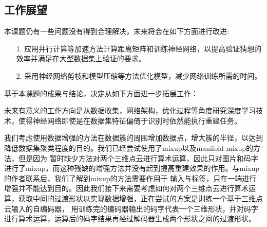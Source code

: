 \documentclass[bachelor, nocolorlinks, printoneside]{seuthesis} %
\begin{document}
\begin{Main}
\section{工作展望}
本课题仍有一些问题没有得到合理解决，未来将会在如下方面进行改进:

\begin{itemize}
    \item[1.] 应用并行计算等加速方法计算距离矩阵和训练神经网络，以提高验证猜想的效率并满足在大型数据集上验证的要求。
    \item[2.] 采用神经网络剪枝和模型压缩等方法优化模型，减少网络训练所需的时间。
\end{itemize}

基于本课题的成果与结论，决定从如下方面进一步拓展工作：

未来有意义的工作方向是从数据收集，网络架构，优化过程等角度研究深度学习技术，使得神经网络即使是在数据集特征偏倚于识别时依然能执行重建任务。

我们考虑使用数据增强的方法在数据簇的周围增加数据点，增大簇的半径，以达到降低数据集聚类程度的目的。我们已经尝试使用了mixup以及manifold mixup的方法，但是因为
暂时缺少方法对两个三维点云进行算术运算，因此只对图片和码字进行了mixup，而这种残缺的增强方法并没有起到提高重建效果的作用。与mixup的作者联系后，我们了解到mixup的方法需要作用于
输入与标签，只在一端进行增强并不能达到目的。因此我们接下来需要考虑如何对两个三维点云进行算术运算，获取中间的过渡形状以实现数据增强，正在尝试的方案是训练一个基于三维点云输入的自编码器，
用训练完的编码器输出的码字代表一个三维形状，并对码字进行算术运算，运算后的码字结果再经过解码器生成两个形状之间的过渡形状。


\end{Main}
\end{document}
